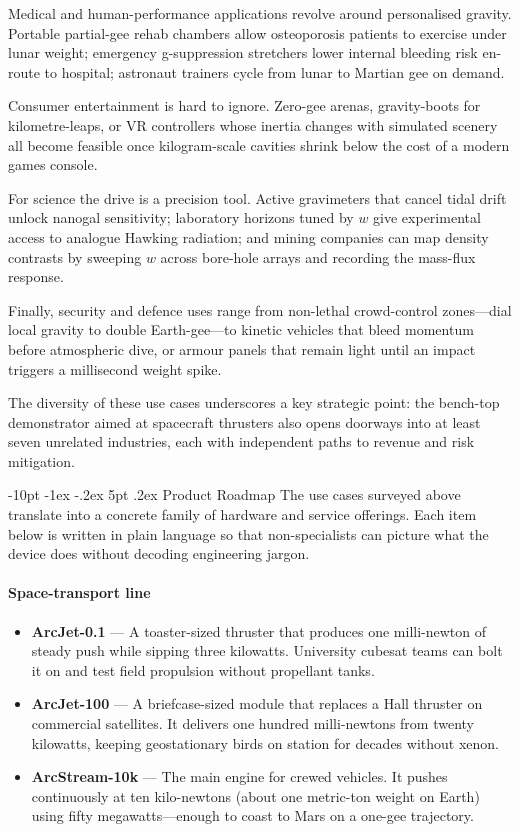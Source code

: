 \documentclass[12pt,letterpaper]{book}
\makeatletter
\renewcommand\section{\@startsection {section}{1}{\z@}%
                {-10pt \@plus -1ex \@minus -.2ex}%
                {5pt \@plus.2ex}%
                {\normalfont\large\bfseries}}
\makeatother
\begin{document}
Medical and human-performance applications revolve around personalised gravity.  Portable partial-gee rehab chambers allow osteoporosis patients to exercise under lunar weight; emergency g-suppression stretchers lower internal bleeding risk en-route to hospital; astronaut trainers cycle from lunar to Martian gee on demand.

Consumer entertainment is hard to ignore.  Zero-gee arenas, gravity-boots for kilometre-leaps, or VR controllers whose inertia changes with simulated scenery all become feasible once kilogram-scale cavities shrink below the cost of a modern games console.

For science the drive is a precision tool.  Active gravimeters that cancel tidal drift unlock nanogal sensitivity; laboratory horizons tuned by $w$ give experimental access to analogue Hawking radiation; and mining companies can map density contrasts by sweeping $w$ across bore-hole arrays and recording the mass-flux response.

Finally, security and defence uses range from non-lethal crowd-control zones—dial local gravity to double Earth-gee—to kinetic vehicles that bleed momentum before atmospheric dive, or armour panels that remain light until an impact triggers a millisecond weight spike.

The diversity of these use cases underscores a key strategic point: the bench-top demonstrator aimed at spacecraft thrusters also opens doorways into at least seven unrelated industries, each with independent paths to revenue and risk mitigation.

\section{Product Roadmap}\label{chap:products}
The use cases surveyed above translate into a concrete family of hardware and service offerings.  Each item below is written in plain language so that non-specialists can picture what the device does without decoding engineering jargon.

\paragraph{Space-transport line}
\begin{itemize}
 \item \textbf{ArcJet-0.1} — A toaster-sized thruster that produces one milli-newton of steady push while sipping three kilowatts.  University cubesat teams can bolt it on and test field propulsion without propellant tanks.
 \item \textbf{ArcJet-100} — A briefcase-sized module that replaces a Hall thruster on commercial satellites.  It delivers one hundred milli-newtons from twenty kilowatts, keeping geostationary birds on station for decades without xenon.
 \item \textbf{ArcStream-10k} — The main engine for crewed vehicles.  It pushes continuously at ten kilo-newtons (about one metric-ton weight on Earth) using fifty megawatts—enough to coast to Mars on a one-gee trajectory.
\end{itemize}
\end{document}
